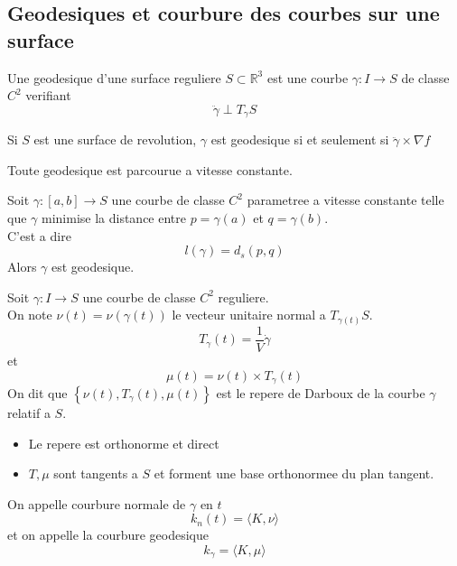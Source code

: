 \documentclass[../main.tex]{subfiles}
\begin{document}
\subsection{Geodesiques et courbure des courbes sur une surface}
\begin{defn}[Geodesique]
	Une geodesique d'une surface reguliere $S \subset \mathbb{R}^{3}$ est une courbe $\gamma:I\to S$ de classe $C^{2}$ verifiant 
	\[ 
	\ddot\gamma \perp T_{\gamma} S
	\]

\end{defn}
\begin{rmq}
Si $S$ est une surface de revolution, $\gamma$ est geodesique si et seulement si $\ddot\gamma \times\nabla f$ 
\end{rmq}
\begin{propo}
Toute geodesique est parcourue a vitesse constante.
\end{propo}
\begin{thm}
	Soit $\gamma: [ a,b] \to S$ une courbe de classe $C^{2}$ parametree a vitesse constante telle que $\gamma$ minimise la distance entre $p= \gamma( a) $ et $q= \gamma( b) $.\\
C'est a dire
\[ 
l( \gamma) = d_s( p,q) 
\]
Alors $\gamma$ est geodesique.
\end{thm}
\begin{defn}
	Soit $\gamma:I\to S$ une courbe de classe $C^{2}$ reguliere.\\
	On note $\nu( t) = \nu( \gamma( t) ) $ le vecteur unitaire normal a $T_{\gamma( t) } S$.\\
	\[ 
	T_{\gamma} ( t) = \frac{1}{V}\dot\gamma
	\]
	et
	\[ 
	\mu( t) =\nu( t) \times T_{\gamma} ( t) 
	\]
	On dit que $ \left\{ \nu( t) ,T_\gamma( t),\mu( t)  \right\} $ est le repere de Darboux de la courbe $\gamma$ relatif a $S$.
\end{defn}
\begin{rmq}
\begin{itemize}
\item Le repere est orthonorme et direct
\item $T,\mu$ sont tangents a $S$ et forment une base orthonormee du plan tangent.
\end{itemize}

\end{rmq}
\begin{defn}
	On appelle courbure normale de $\gamma$ en $t$ 
	\[ 
k_n( t) = \langle K,\nu\rangle	
	\]
et on appelle la courbure geodesique
\[ 
k_\gamma = \langle K, \mu\rangle
\]

\end{defn}
\end{document}
